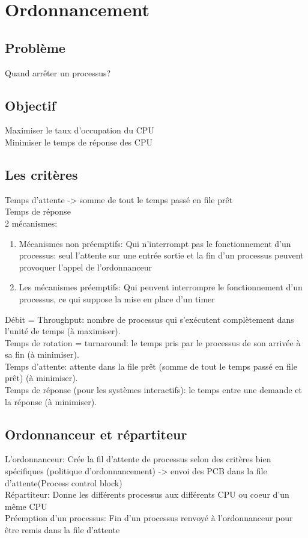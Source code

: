 \chapter{Ordonnancement}
\section{Problème}
Quand arrêter un processus?

\section{Objectif}
Maximiser le taux d'occupation du CPU\\
Minimiser le temps de réponse des CPU

\section{Les critères}
Temps d'attente -> somme de tout le temps passé en file prêt\\
Temps de réponse\\
2 mécanismes:
\begin{enumerate}
\item Mécanismes non préemptifs: Qui n'interrompt pas le fonctionnement d'un processus: seul l'attente sur une entrée sortie et la fin d'un processus peuvent provoquer l'appel de l'ordonnanceur
\item Les mécanismes préemptifs: Qui peuvent interrompre le fonctionnement d'un processus, ce qui suppose la mise en place d'un timer
\end{enumerate}
Débit = Throughput: nombre de processus qui s’exécutent complètement dans l’unité
de temps (à maximiser).\\
Temps de rotation = turnaround: le temps pris par le processus de son arrivée à sa
fin (à minimiser).\\
Temps d’attente: attente dans la file prêt (somme de tout le temps passé en file prêt)
(à minimiser).\\
Temps de réponse (pour les systèmes interactifs): le temps entre une demande et la
réponse (à minimiser).

\section{Ordonnanceur et répartiteur}
L'ordonnanceur: Crée la fil d'attente de processus selon des critères bien spécifiques (politique d'ordonnancement) -> envoi des PCB dans la file d'attente(Process control block)\\
Répartiteur: Donne les différents processus aux différents CPU ou coeur d'un même CPU\\
Préemption d'un processus: Fin d'un processus renvoyé à l'ordonnanceur pour être remis dans la file d'attente

